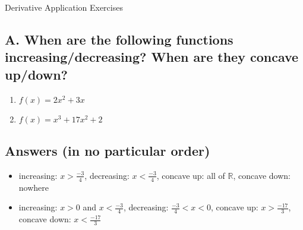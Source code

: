 \documentclass{article}
\newcommand{\R}{\mathbb{R}}
\begin{document}
\begin{center}
\begin{Huge}Derivative Application Exercises\end{Huge}
\end{center}


\subsection*{A. When are the following functions increasing/decreasing? When are they concave up/down?}

\begin{enumerate}
\item $f(x)=2x^2+3x$
\item $f(x)=x^3+17x^2+2$
\end{enumerate}



\newpage



\subsection*{Answers (in no particular order)}

\begin{itemize}
\item increasing: $x>\frac{-3}{4}$, decreasing: $x<\frac{-3}{4}$, concave up: all of $\R$, concave down: nowhere
\item increasing: $x>0$ and $x<\frac{-3}{4}$, decreasing: $\frac{-3}{4}<x<0$, concave up: $x>\frac{-17}{3}$, concave down: $x<\frac{-17}{3}$
\end{itemize}
\end{document}
